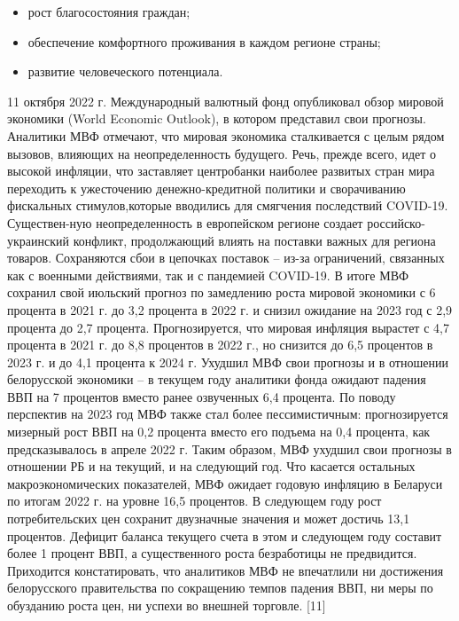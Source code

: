 \documentclass[14pt,a4paper]{article}
\begin{document}
    \begin{itemize}
        \item рост благосостояния граждан;
        \item обеспечение комфортного проживания в каждом регионе страны;
        \item развитие человеческого потенциала.
    \end{itemize}
    \par
    11 октября 2022 г. Международный валютный фонд опубликовал обзор мировой экономики (World Economic Outlook), в котором представил свои прогнозы.
    Аналитики МВФ отмечают, что мировая экономика сталкивается с целым рядом вызовов, влияющих на неопределенность будущего.
    Речь, прежде всего, идет о высокой инфляции, что заставляет центробанки наиболее развитых стран мира переходить к ужесточению денежно-кредитной политики и сворачиванию фискальных стимулов,которые вводились для смягчения последствий COVID-19.
    Существен-ную неопределенность в европейском регионе создает российско-украинский конфликт, продолжающий влиять на поставки важных для региона товаров.
    Сохраняются сбои в цепочках поставок – из-за ограничений, связанных как с военными действиями, так и с пандемией COVID-19.
    В итоге МВФ сохранил свой июльский прогноз по замедлению роста мировой экономики с 6 процента в 2021 г. до 3,2 процента в 2022 г. и снизил ожидание на 2023 год с 2,9 процента до 2,7 процента.
    Прогнозируется, что мировая инфляция вырастет с 4,7 процента в 2021 г. до 8,8 процентов в 2022 г., но снизится до 6,5 процентов в 2023 г. и до 4,1 процента к 2024 г.
    Ухудшил МВФ свои прогнозы и в отношении белорусской экономики – в текущем году аналитики фонда ожидают падения ВВП на 7 процентов вместо ранее озвученных 6,4 процента.
    По поводу перспектив на 2023 год МВФ также стал более пессимистичным: прогнозируется мизерный рост ВВП на 0,2 процента вместо его подъема на 0,4 процента, как предсказывалось в апреле 2022 г.
    Таким образом, МВФ ухудшил свои прогнозы в отношении РБ и на текущий, и на следующий год. Что касается остальных макроэкономических показателей, МВФ ожидает годовую инфляцию в Беларуси по итогам 2022 г. на уровне 16,5 процентов.
    В следующем году рост потребительских цен сохранит двузначные значения и может достичь 13,1 процентов.
    Дефицит баланса текущего счета в этом и следующем году составит более 1 процент ВВП, а существенного роста безработицы не предвидится.
    Приходится констатировать, что аналитиков МВФ не впечатлили ни достижения белорусского правительства по сокращению темпов падения ВВП, ни меры по обузданию роста цен, ни успехи во внешней торговле. [11]
\end{document}
